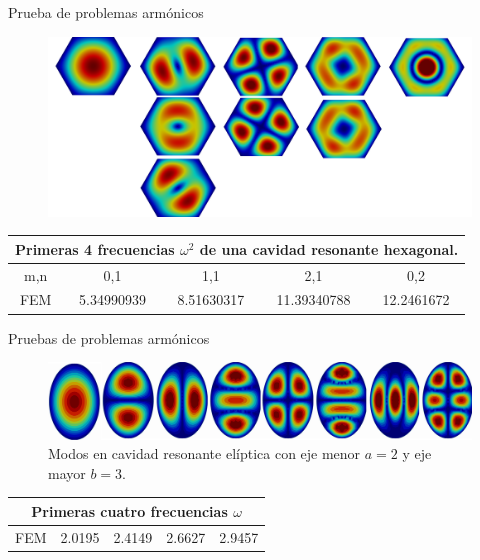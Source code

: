\documentclass[xcolor=table,serif,handout]{beamer}
\begin{document}
	\begin{frame}{Prueba de problemas armónicos}
	\begin{figure}
\centering
\includegraphics[scale=0.07]{hexagonal_waveguide.pdf}
\end{figure}
\small
\begin{center}
\begin{tabular}{|c|c|c|c|c|}
\hline
\multicolumn{5}{|c|}{Primeras 4 frecuencias $\omega^2$ de una cavidad resonante hexagonal.} \\
\hline 
m,n & 0,1 & 1,1 & 2,1 & 0,2 \\ 
\hline 
FEM     & 5.34990939 & 8.51630317 & 11.39340788 & 12.2461672 \\ 
\hline 
\end{tabular} 
\label{tab:hex_wav_comparison}
\end{center}
	\end{frame}
	\begin{frame}{Pruebas de problemas armónicos}
		\begin{figure}
		\centering
		\includegraphics[scale=0.07]{elliptical_waveguide.eps}
		\caption{Modos en cavidad resonante elíptica con eje menor  $a=2$ y eje mayor $b=3$.}
		\end{figure}	
		\begin{center}
		\begin{tabular}{|c|c|c|c|c|}
		\hline
		\multicolumn{5}{|c|}{Primeras cuatro frecuencias $\omega$} 		\\
		\hline 
		FEM & 2.0195 & 2.4149 & 2.6627 & 2.9457 \\ 
		\hline 
		\end{tabular} 
		\end{center}	
	\end{frame}
\end{document}
